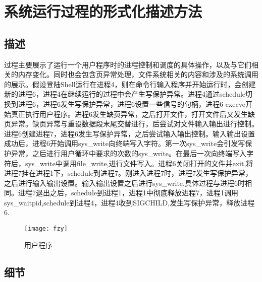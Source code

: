 \documentclass[]{report}
\begin{document}
\chapter{系统运行过程的形式化描述方法}

\section{描述}

过程主要展示了运行一个用户程序时的进程控制和调度的具体操作，以及与它们相关的内存变化。同时也会包含页异常处理，文件系统相关的内容和涉及的系统调用的展示。假设登陆Shell运行在进程4，则在命令行输入程序并开始运行时，会创建新的进程6，进程4在继续运行的过程中会产生写保护异常。进程4通过schedule切换到进程6，进程6发生写保护异常，进程6设置一些信号的句柄，进程6 execve开始真正执行用户程序。进程6发生缺页异常，之后打开文件，打开文件后又发生缺页异常。缺页异常与重设数据段末尾交替进行，后尝试对文件输入输出进行控制。进程6创建进程7，进程6发生写保护异常，之后尝试输入输出控制。输入输出设置成功后，进程6开始调用sys\_write向终端写入字符。第一次sys\_write会引发写保护异常，之后进行用户循环中要求的次数的sys\_write。在最后一次向终端写入字符后，sys\_write中调用file\_write,进行文件写入。进程6关闭打开的文件并exit,将进程7挂在进程1下，schedule到进程7。刚进入进程7时，进程7发生写保护异常，之后进行输入输出设置。输入输出设置之后进行sys\_write,具体过程与进程6时相同。进程7退出之后，schedule到进程1，进程1中彻底释放进程7，进程1调用sys\_waitpid,schedule到进程4，进程4收到SIGCHILD,发生写保护异常，释放进程6.

\begin{figure}[H]%
	\centering  %
	\texttt{[image: fzy]}  
	\caption{用户程序}  %
	\label{fig2}
\end{figure}

\section{细节}
\end{document}
